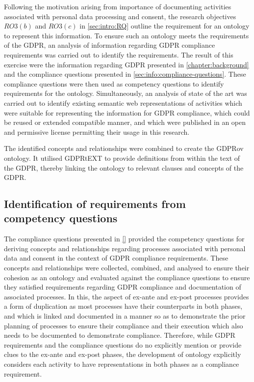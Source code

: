 Following the motivation arising from importance of documenting activities associated with personal data processing and consent, the research objectives $RO3(b)$ and $RO3(c)$ in \autoref{sec:intro:RQ} outline the requirement for an ontology to represent this information.
To ensure such an ontology meets the requirements of the GDPR, an analysis of information regarding GDPR compliance requirements was carried out to identify the requirements.
The result of this exercise were the information regarding GDPR presented in \autoref{chapter:background} and the compliance questions presented in \autoref{sec:info:compliance-questions}.
These compliance questions were then used as competency questions to identify requirements for the ontology.
Simultaneously, an analysis of state of the art was carried out to identify existing semantic web representations of activities which were suitable for representing the information for GDPR compliance, which could be reused or extended compatible manner, and which were published in an open and permissive license permitting their usage in this research.

The identified concepts and relationships were combined to create the GDPRov ontology. It utilised GDPRtEXT to provide definitions from within the text of the GDPR, thereby linking the ontology to relevant clauses and concepts of the GDPR. 

\subsection{Identification of requirements from competency questions}
The compliance questions presented in \autoref{} provided the competency questions for deriving concepts and relationships regarding processes associated with personal data and consent in the context of GDPR compliance requirements. 
These concepts and relationships were collected, combined, and analysed to ensure their cohesion as an ontology and evaluated against the compliance questions to ensure they satisfied requirements regarding GDPR compliance and documentation of associated processes.
In this, the aspect of ex-ante and ex-post processes provides a form of duplication as most processes have their counterparts in both phases, and which is linked and documented in a manner so as to demonstrate the prior planning of processes to ensure their compliance and their execution which also needs to be documented to demonstrate compliance.
Therefore, while GDPR requirements and the compliance questions do no explicitly mention or provide clues to the ex-ante and ex-post phases, the development of ontology explicitly considers each activity to have representations in both phases as a compliance requirement.

